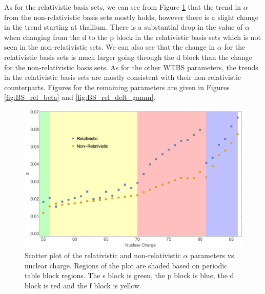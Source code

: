 As for the relativistic basis sets, we can see from Figure \ref{fig:BS_rel_alpha} that the trend in $\alpha$ from the non-relativistic basis sets mostly holds, however there is a slight change in the trend starting at thallium. There is a substantial drop in the value of $\alpha$ when changing from the d to the p block in the relativistic basis sets which is not seen in the non-relativistic sets. We can also see that the change in $\alpha$ for the relativistic basis sets is much larger going through the d block than the change for the non-relativistic basis sets. As for the other WTBS parameters, the trends in the relativistic basis sets are mostly consistent with their non-relativistic counterparts. Figures for the remaining parameters are given in Figures \ref{fig:BS_rel_beta} and \ref{fig:BS_rel_delt_gamm}.

\begin{figure}
\center
\includegraphics[width=1\textwidth]{Figures/BS_rel_alpha.png}
\caption[Scatter plot of the relativistic and non-relativistic $\alpha$ parameters vs. nuclear charge.]
{Scatter plot of the relativistic and non-relativistic $\alpha$ parameters vs. nuclear charge. Regions of the plot are shaded based on periodic table block regions. The s block is green, the p block is blue, the d block is red and the f block is yellow.}
\label{fig:BS_rel_alpha}
\end{figure}

